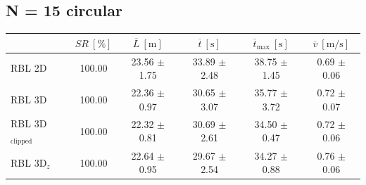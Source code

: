         \subsection{N = 15 circular}
        \begin{table}[H]
            \centering
            \renewcommand{\arraystretch}{1.2}
            \begin{tabular}{|l|c|c|c|c|c|}
            \hline
                                        & \( SR \ [\%] \) & \( \overline{L} \ [\mathrm{m}] \) & \( \overline{t} \ [\mathrm{s}] \) & \( \overline{t}_{\text{max}} \ [\mathrm{s}] \) & \( \overline{v} \ [\mathrm{m/s}] \)     \\ \hline
            RBL 2D                      & 100.00          & 23.56 $\pm$ 1.75                  & 33.89 $\pm$ 2.48                  & 38.75 $\pm$ 1.45                               & 0.69 $\pm$ 0.06                         \\ \hline
            RBL 3D                      & 100.00          & 22.36 $\pm$ 0.97                  & 30.65 $\pm$ 3.07                  & 35.77 $\pm$ 3.72                               & 0.72 $\pm$ 0.07                         \\ \hline
            RBL 3D\(_{\text{clipped}}\) & 100.00          & 22.32 $\pm$ 0.81                  & 30.69 $\pm$ 2.61                  & 34.50 $\pm$ 0.47                               & 0.72 $\pm$ 0.06                         \\ \hline
            RBL 3D\(_z\)                & 100.00          & 22.64 $\pm$ 0.95                  & 29.67 $\pm$ 2.54                  & 34.27 $\pm$ 0.88                               & 0.76 $\pm$ 0.06                         \\ \hline
            \end{tabular}
        \end{table}
    
